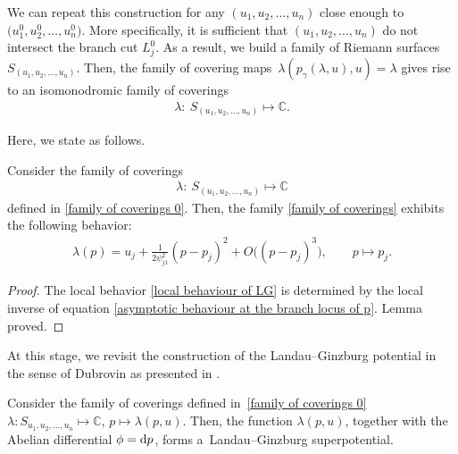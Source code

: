  We can repeat this construction for any $(u_1,u_2,\dots,u_n)$ close enough to $\bigl(u_1^0,u_2^0,\dots,u_n^0\bigr)$. More specifically, it is sufficient that $(u_1,u_2,\dots,u_n)$ do not intersect the branch cut $L_j^0$. As a result, we build a family of Riemann surfaces $S_{(u_1,u_2,\dots,u_n)}$. Then, the family of covering maps~${
\lambda(p_{\gamma}(\lambda,u),u)=\lambda}
$
gives rise to an isomonodromic family of coverings
\begin{gather}\label{family of coverings 0}
\lambda \colon\ S_{(u_1,u_2,\dots,u_n)}\mapsto \mathbb{C}.
\end{gather}

Here, we state \cite[Proposition I.1]{B.Dubrovin2} as follows.

\begin{Lemma}\label{main constructive LG lemma}
Consider the family of coverings
\begin{gather}\label{family of coverings}
\lambda \colon\ S_{(u_1,u_2,\dots,u_n)}\mapsto \mathbb{C}
\end{gather}
defined in \eqref{family of coverings 0}. Then, the family \eqref{family of coverings} exhibits the following behavior:
\begin{gather}\label{local behaviour of LG}
\lambda(p)=u_j+ \frac{1}{2\psi^2_{j1}}( p-p_j)^2+O\bigl(( p-p_j)^3\bigr), \qquad p\mapsto p_j.
\end{gather}
\end{Lemma}

\begin{proof}
The local behavior \eqref{local behaviour of LG} is determined by the local inverse of equation \eqref{asymptotic behaviour at the branch locus of p}. Lemma proved.
\end{proof}

At this stage, we revisit the construction of the Landau--Ginzburg potential in the sense of Dubrovin as presented in \cite[Theorem~5.3]{B.Dubrovin3}.

\begin{Theorem}\label{Dubrovin superpotential theorem}
Consider the family of coverings defined in~\eqref{family of coverings 0}
$
\lambda \colon S_{u_1,u_2,\dots,u_n}\mapsto \mathbb{C}$, $ p\mapsto \lambda(p,u)$.
Then, the function $\lambda(p,u)$, together with the Abelian differential $\phi={\rm d}p$, forms a~Landau--Ginzburg superpotential.
\end{Theorem}


